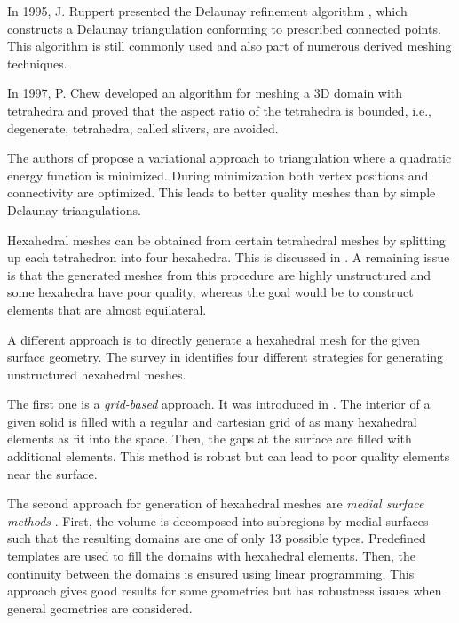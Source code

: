 In 1995, J. Ruppert presented the Delaunay refinement algorithm \cite{Ruppert1995}, which constructs a Delaunay triangulation conforming to prescribed connected points. This algorithm is still commonly used and also part of numerous derived meshing techniques.

In 1997, P. Chew developed an algorithm for meshing a 3D domain with tetrahedra \cite{chew1997guaranteed} and proved that the aspect ratio of the tetrahedra is bounded, i.e., degenerate,  tetrahedra, called slivers, are avoided.

The authors of \cite{Alliez2005Variational} propose a variational approach to triangulation where a quadratic energy function is minimized. During minimization both vertex positions and connectivity are optimized. This leads to better quality meshes than by simple Delaunay triangulations.

Hexahedral meshes can be obtained from certain tetrahedral meshes by splitting up each tetrahedron into four hexahedra. This is discussed in \cite{eppstein1999linear}. A remaining issue is that the generated meshes from this procedure are highly unstructured and some hexahedra have poor quality, whereas the goal would be to construct elements that are almost equilateral.

A different approach is to directly generate a hexahedral mesh for the given surface geometry.
The survey in \cite{owen1998survey} identifies four different strategies for generating unstructured hexahedral meshes.

The first one is a \emph{grid-based} approach. It was introduced in \cite{schneiders1996grid,schneiders1997algorithm}. The interior of a given solid is filled with a regular and cartesian grid of as many hexahedral elements as fit into the space. Then, the gaps at the surface are filled with additional elements. This method is robust but can lead to poor quality elements near the surface. 

The second approach for generation of hexahedral meshes are \emph{medial surface methods} \cite{price1995hexahedral, price1997hexahedral}. First, the volume is decomposed into subregions by medial surfaces such that the resulting domains are one of only 13 possible types. Predefined templates are used to fill the domains with hexahedral elements. Then, the continuity between the domains is ensured using linear programming. This approach gives good results for some geometries but has robustness issues when general geometries are considered.

